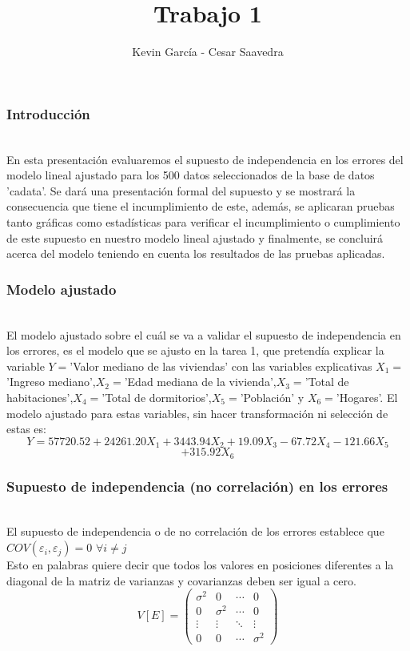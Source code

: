 \documentclass[12pt]{beamer}
\author{Kevin García - Cesar Saavedra}
\title{Trabajo 1}
\begin{document}
\begin{frame}
\titlepage
\end{frame}

\begin{frame}
\frametitle{Introducción}
~\\En esta presentación evaluaremos el supuesto de independencia en los errores del modelo lineal ajustado para
los 500 datos seleccionados de la base de datos 'cadata'. Se dará una presentación formal del supuesto y se mostrará la consecuencia que tiene el incumplimiento de este, además, se aplicaran pruebas tanto gráficas como estadísticas para verificar el incumplimiento o cumplimiento de este supuesto en nuestro modelo lineal ajustado y finalmente, se concluirá acerca del modelo teniendo en cuenta los resultados de las pruebas aplicadas.
\end{frame}

\begin{frame}
\frametitle{Modelo ajustado}
~\\ El modelo ajustado sobre el cuál se va a validar el supuesto de independencia en los errores, es el modelo que se ajusto en la tarea 1, que pretendía explicar la variable $Y=$'Valor mediano de las viviendas' con las variables explicativas $X_{1}=$'Ingreso mediano',$X_{2}=$'Edad mediana de la vivienda',$X_{3}=$'Total de habitaciones',$X_{4}=$'Total de dormitorios',$X_{5}=$'Población' y $X_{6}=$'Hogares'. El modelo ajustado para estas variables, sin hacer transformación ni selección de estas es:
$$Y = 57720.52 + 24261.20X_{1} + 3443.94X_{2} + 19.09X_{3} - 67.72X_{4} - 121.66X_{5}$$ 
$$+315.92X_{6}$$
\end{frame}

\begin{frame}
\frametitle{Supuesto de independencia (no correlación) en los errores}
~\\ El supuesto de independencia o de no correlación de los errores establece que $COV(\varepsilon_{i},\varepsilon_{j})=0$ $\forall i\neq j$
~\\ Esto en palabras quiere decir que todos los valores en posiciones diferentes a la diagonal de la matriz de varianzas y covarianzas deben ser igual a cero.
~\\\[V[E]=
\left( \begin{array}{cccc}
 \sigma^2 & 0 & \cdots & 0 \\ 
 0 & \sigma^2 & \cdots & 0 \\
 \vdots & \vdots & \ddots & \vdots \\
 0 & 0 & \cdots & \sigma^2
\end{array} \right) \]

\end{frame}
\end{document}
